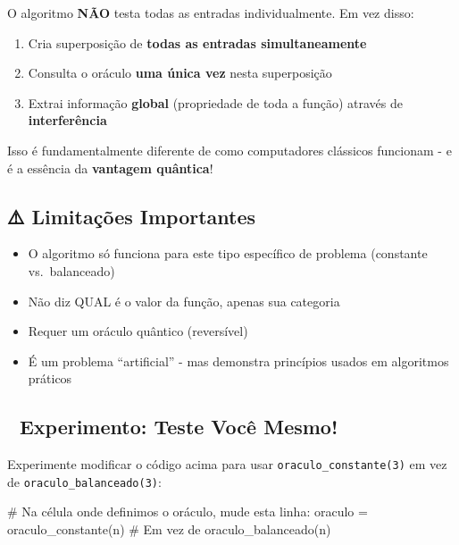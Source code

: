 \documentclass[
  brazilian,
]{report}
\newenvironment{Shaded}{\begin{snugshade}}{\end{snugshade}}
\newcommand{\CommentTok}[1]{\textcolor[rgb]{0.37,0.37,0.37}{#1}}
\newcommand{\NormalTok}[1]{\textcolor[rgb]{0.00,0.23,0.31}{#1}}
\newcommand{\OperatorTok}[1]{\textcolor[rgb]{0.37,0.37,0.37}{#1}}
\providecommand{\tightlist}{%
  \setlength{\itemsep}{0pt}\setlength{\parskip}{0pt}}
\begin{document}
O algoritmo \textbf{NÃO} testa todas as entradas individualmente. Em vez
disso:

\begin{enumerate}
\def\labelenumi{\arabic{enumi}.}
\tightlist
\item
  Cria superposição de \textbf{todas as entradas simultaneamente}
\item
  Consulta o oráculo \textbf{uma única vez} nesta superposição
\item
  Extrai informação \textbf{global} (propriedade de toda a função)
  através de \textbf{interferência}
\end{enumerate}

Isso é fundamentalmente diferente de como computadores clássicos
funcionam - e é a essência da \textbf{vantagem quântica}!

\subsection{⚠️ Limitações
Importantes}\label{limitauxe7uxf5es-importantes}

\begin{itemize}
\tightlist
\item
  O algoritmo só funciona para este tipo específico de problema
  (constante vs.~balanceado)
\item
  Não diz QUAL é o valor da função, apenas sua categoria
\item
  Requer um oráculo quântico (reversível)
\item
  É um problema ``artificial'' - mas demonstra princípios usados em
  algoritmos práticos
\end{itemize}

\subsection{🔬 Experimento: Teste Você
Mesmo!}\label{experimento-teste-vocuxea-mesmo}

Experimente modificar o código acima para usar
\texttt{oraculo\_constante(3)} em vez de
\texttt{oraculo\_balanceado(3)}:

\begin{Shaded}
\begin{Highlighting}[]
\CommentTok{\# Na célula onde definimos o oráculo, mude esta linha:}
\NormalTok{oraculo }\OperatorTok{=}\NormalTok{ oraculo\_constante(n)  }\CommentTok{\# Em vez de oraculo\_balanceado(n)}
\end{Highlighting}
\end{Shaded}
\end{document}
